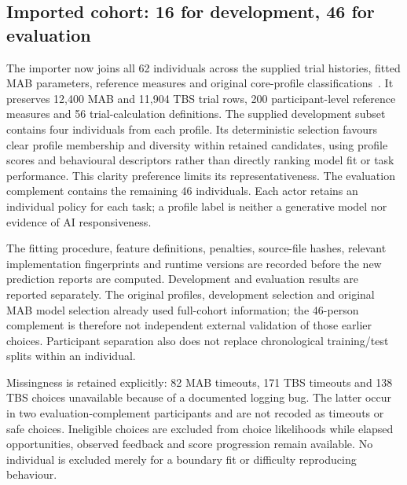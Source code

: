 \documentclass[11pt,a4paper]{article}
\begin{document}
\subsection{Imported cohort: 16 for development, 46 for evaluation}
The importer now joins all 62 individuals across the supplied trial histories, fitted MAB parameters, reference measures and original core-profile classifications~\cite{handover}. It preserves 12,400 MAB and 11,904 TBS trial rows, 200 participant-level reference measures and 56 trial-calculation definitions. The supplied development subset contains four individuals from each profile. Its deterministic selection favours clear profile membership and diversity within retained candidates, using profile scores and behavioural descriptors rather than directly ranking model fit or task performance. This clarity preference limits its representativeness. The evaluation complement contains the remaining 46 individuals. Each actor retains an individual policy for each task; a profile label is neither a generative model nor evidence of AI responsiveness.

The fitting procedure, feature definitions, penalties, source-file hashes, relevant implementation fingerprints and runtime versions are recorded before the new prediction reports are computed. Development and evaluation results are reported separately. The original profiles, development selection and original MAB model selection already used full-cohort information; the 46-person complement is therefore not independent external validation of those earlier choices. Participant separation also does not replace chronological training/test splits within an individual.

Missingness is retained explicitly: 82 MAB timeouts, 171 TBS timeouts and 138 TBS choices unavailable because of a documented logging bug. The latter occur in two evaluation-complement participants and are not recoded as timeouts or safe choices. Ineligible choices are excluded from choice likelihoods while elapsed opportunities, observed feedback and score progression remain available. No individual is excluded merely for a boundary fit or difficulty reproducing behaviour.
\end{document}
